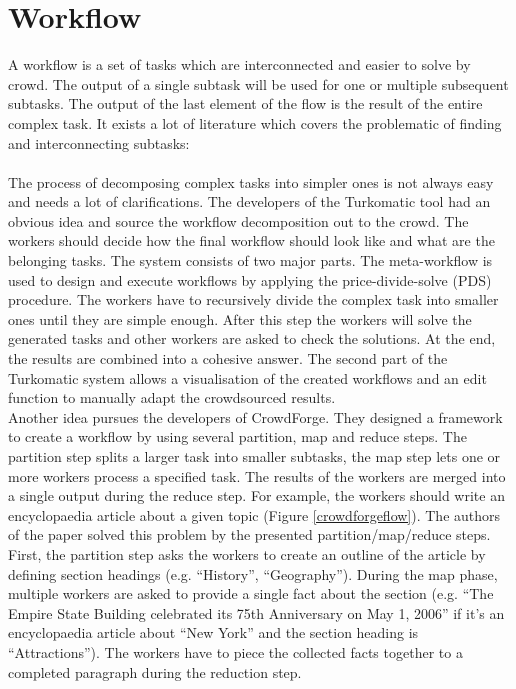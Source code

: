 \section{Workflow}
A workflow is a set of tasks which are interconnected and easier to solve by crowd. The output of a single subtask will be used for one or multiple subsequent subtasks. The output of the last element of the flow is the result of the entire complex task. It exists a lot of literature which covers the problematic of finding and interconnecting subtasks:\\\\
The process of decomposing complex tasks into simpler ones is not always easy and needs a lot of clarifications. The developers of the Turkomatic\cite{turkomatic} tool had an obvious idea and source the workflow decomposition out to the crowd. The workers should decide how the final workflow should look like and what are the belonging tasks. The system consists of two major parts. The meta-workflow is used to design and execute workflows by applying the price-divide-solve (PDS) procedure. The workers have to recursively divide the complex task into smaller ones until they are simple enough. After this step the workers will solve the generated tasks and other workers are asked to check the solutions. At the end, the results are combined into a cohesive answer. The second part of the Turkomatic system allows a visualisation of the created workflows and an edit function to manually adapt the crowdsourced results.\\
Another idea pursues the developers of CrowdForge\cite{crowdforge}. They designed a framework to create a workflow by using several partition, map and reduce steps. The partition step splits a larger task into smaller subtasks, the map step lets one or more workers process a specified task. The results of the workers are merged into a single output during the reduce step. For example, the workers should write an encyclopaedia article about a given topic (Figure \ref{crowdforgeflow}). The authors of the paper solved this problem by the presented partition/map/reduce steps. First, the partition step asks the workers to create an outline of the article by defining section headings (e.g. ``History'', ``Geography''). During the map phase, multiple workers are asked to provide a single fact about the section (e.g. ``The Empire State Building celebrated its 75th Anniversary on May 1, 2006'' if it's an encyclopaedia article about ``New York'' and the section heading is ``Attractions''). The workers have to piece the collected facts together to a completed paragraph during the reduction step.\\
